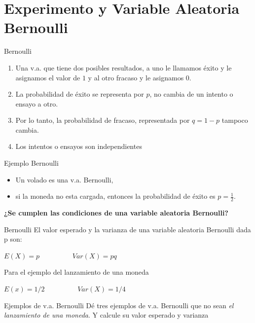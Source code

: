 \documentclass[11pt]{beamer}
\begin{document}
\section{Experimento y Variable Aleatoria Bernoulli}


\begin{frame}{Bernoulli}
\begin{enumerate}
\item Una v.a. que tiene dos posibles resultados, a uno le llamamos éxito y  le asignamos el valor de $1$ y al otro fracaso y le asignamos $0$.
\item La probabilidad de éxito se representa por $p$, no cambia de un intento o ensayo a otro.
\item Por lo tanto, la probabilidad de fracaso, representada por $q=1-p$ tampoco cambia.
\item Los intentos o ensayos son independientes
\end{enumerate}
\end{frame}
\begin{frame}{Ejemplo Bernoulli}
\begin{itemize}
\item Un volado es una v.a. Bernoulli,   
\item si la moneda no esta cargada, entonces la probabilidad de éxito es  $p=\frac{1}{2}$.
\end{itemize}
\begin{center}
{\large \textbf{¿Se cumplen las condiciones de una variable aleatoria Bernoulli?}}
\end{center}
\end{frame}
\begin{frame}{Bernoulli}
El valor esperado y la varianza de una variable aleatoria Bernoulli dada p son:
\begin{center}
$E(X)=p \hspace{2cm} Var(X)=p q$
\end{center}
Para el ejemplo del lanzamiento de una moneda 
\begin{center}
$E(x)=1/2 \hspace{2cm} Var(X)=1/4$
\end{center}
\end{frame}
\begin{frame}{Ejemplos de v.a. Bernoulli}
Dé tres ejemplos de v.a. Bernoulli que no sean \textit{el lanzamiento de una moneda}.
Y calcule su valor esperado y varianza

\end{frame}
\end{document}
